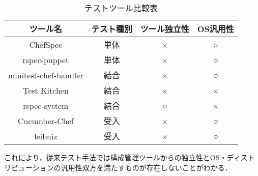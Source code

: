 \begin{table}[htb]
  \begin{center}
    \begin{tabular}{|c|c|c|c|}
      \hline
      ツール名 & テスト種別 & ツール独立性 & OS汎用性 \\
      \hline
      \hline
      ChefSpec              & 単体 & ×  & ○ \\
      \hline
      rspec-puppet          & 単体 & ×  & ○ \\
      \hline
      minitest-chef-handler & 結合 & ×  & ○ \\
      \hline
      Test Kitchen          & 結合 & ×  & × \\
      \hline
      rspec-system          & 結合 & ○ & × \\
      \hline
      Cucumber-Chef         & 受入 & ×  & ○ \\
      \hline
      leibniz               & 受入 & ×  & ○ \\
      \hline
    \end{tabular}
    \label{tab:comparison}
    \caption{テストツール比較表}
  \end{center}
\end{table}

これにより，従来テスト手法では構成管理ツールからの独立性とOS・ディストリビューションの汎用性双方を満たすものが存在しないことがわかる．
